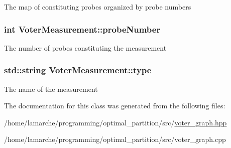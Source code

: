 The map of constituting probes organized by probe numbers \hypertarget{classVoterMeasurement_a8cd0709289a4d1af82586d4b09c5a43a}{
\subsubsection[{probe\-Number}]{\setlength{\rightskip}{0pt plus 5cm}int Voter\-Measurement\-::probe\-Number}}\label{classVoterMeasurement_a8cd0709289a4d1af82586d4b09c5a43a}
The number of probes constituting the measurement \hypertarget{classVoterMeasurement_ad4471a133827f052622a84c4a451aabe}{
\subsubsection[{type}]{\setlength{\rightskip}{0pt plus 5cm}std\-::string Voter\-Measurement\-::type}}\label{classVoterMeasurement_ad4471a133827f052622a84c4a451aabe}
The name of the measurement 

The documentation for this class was generated from the following files\-:\begin{DoxyCompactItemize}
\item 
/home/lamarche/programming/optimal\-\_\-partition/src/\hyperlink{voter__graph_8hpp}{voter\-\_\-graph.\-hpp}\item 
/home/lamarche/programming/optimal\-\_\-partition/src/voter\-\_\-graph.\-cpp\end{DoxyCompactItemize}
